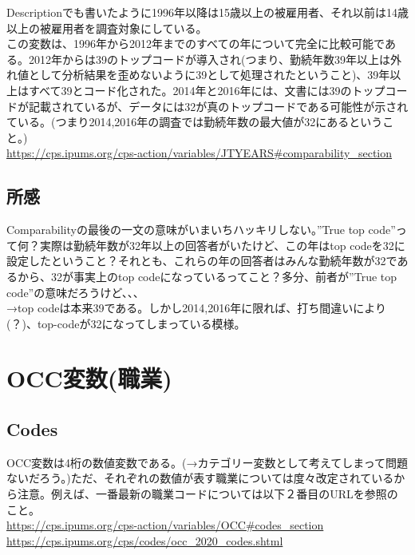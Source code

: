 \documentclass{jsarticle}
\begin{document}
Descriptionでも書いたように1996年以降は15歳以上の被雇用者、それ以前は14歳以上の被雇用者を調査対象にしている。\\
  
この変数は、1996年から2012年までのすべての年について完全に比較可能である。2012年からは39のトップコードが導入され(つまり、勤続年数39年以上は外れ値として分析結果を歪めないように39として処理されたということ)、39年以上はすべて39とコード化された。2014年と2016年には、文書には39のトップコードが記載されているが、データには32が真のトップコードである可能性が示されている。(つまり2014,2016年の調査では勤続年数の最大値が32にあるということ。)
\\
\url{https://cps.ipums.org/cps-action/variables/JTYEARS#comparability_section}

\subsection{所感}
Comparabilityの最後の一文の意味がいまいちハッキリしない。”True top code”って何？実際は勤続年数が32年以上の回答者がいたけど、この年はtop codeを32に設定したということ？それとも、これらの年の回答者はみんな勤続年数が32であるから、32が事実上のtop codeになっているってこと？多分、前者が”True top code”の意味だろうけど、、、\\
  
→top codeは本来39である。しかし2014,2016年に限れば、打ち間違いにより(？)、top-codeが32になってしまっている模様。

\section{OCC変数(職業)}

\subsection{Codes}
OCC変数は4桁の数値変数である。(→カテゴリー変数として考えてしまって問題ないだろう。)ただ、それぞれの数値が表す職業については度々改定されているから注意。例えば、一番最新の職業コードについては以下２番目のURLを参照のこと。\\
\url{https://cps.ipums.org/cps-action/variables/OCC#codes_section}\\
\url{https://cps.ipums.org/cps/codes/occ_2020_codes.shtml}\\
\end{document}
